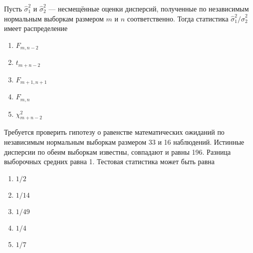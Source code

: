 \documentclass[t]{beamer}
\begin{document}
 \begin{frame} \label{8} 
\begin{block}{8} 

  Пусть $\hat\sigma^2_1$ и  $\hat\sigma^2_2$ — несмещённые оценки дисперсий, полученные по независимым нормальным выборкам размером $m$ и $n$ соответственно. Тогда статистика $\hat\sigma^2_1/\hat\sigma^2_2$ имеет распределение


 \end{block} 
\begin{enumerate} 
\item[] \hyperlink{8-No}{\beamergotobutton{} $F_{m,n-2}$}
\item[] \hyperlink{8-No}{\beamergotobutton{} $t_{m+n-2}$}
\item[] \hyperlink{8-No}{\beamergotobutton{} $F_{m+1, n+1}$}
\item[] \hyperlink{8-No}{\beamergotobutton{} $F_{m,n}$}
\item[] \hyperlink{8-No}{\beamergotobutton{} $\chi^2_{m+n-2}$}
\end{enumerate} 
\end{frame} 


 \begin{frame} \label{9} 
\begin{block}{9} 

  Требуется проверить гипотезу о равенстве математических ожиданий по независимым нормальным выборкам размером 33 и 16 наблюдений. Истинные дисперсии по обеим выборкам известны, совпадают и равны 196. Разница выборочных средних равна 1. Тестовая статистика может быть равна


 \end{block} 
\begin{enumerate} 
\item[] \hyperlink{9-No}{\beamergotobutton{} $1/2$}
\item[] \hyperlink{9-No}{\beamergotobutton{} $1/14$}
\item[] \hyperlink{9-No}{\beamergotobutton{} $1/49$}
\item[] \hyperlink{9-Yes}{\beamergotobutton{} $1/4$}
\item[] \hyperlink{9-No}{\beamergotobutton{} $1/7$}
\end{enumerate} 
\end{frame} 
\end{document}
